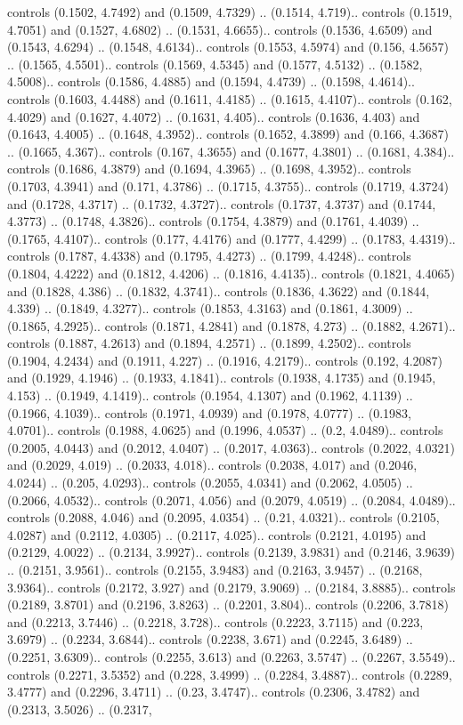 controls (0.1502, 4.7492) and (0.1509, 4.7329) .. (0.1514, 4.719).. controls (0.1519, 4.7051) and (0.1527, 4.6802) .. (0.1531, 4.6655).. controls (0.1536, 4.6509) and (0.1543, 4.6294) .. (0.1548, 4.6134).. controls (0.1553, 4.5974) and (0.156, 4.5657) .. (0.1565, 4.5501).. controls (0.1569, 4.5345) and (0.1577, 4.5132) .. (0.1582, 4.5008).. controls (0.1586, 4.4885) and (0.1594, 4.4739) .. (0.1598, 4.4614).. controls (0.1603, 4.4488) and (0.1611, 4.4185) .. (0.1615, 4.4107).. controls (0.162, 4.4029) and (0.1627, 4.4072) .. (0.1631, 4.405).. controls (0.1636, 4.403) and (0.1643, 4.4005) .. (0.1648, 4.3952).. controls (0.1652, 4.3899) and (0.166, 4.3687) .. (0.1665, 4.367).. controls (0.167, 4.3655) and (0.1677, 4.3801) .. (0.1681, 4.384).. controls (0.1686, 4.3879) and (0.1694, 4.3965) .. (0.1698, 4.3952).. controls (0.1703, 4.3941) and (0.171, 4.3786) .. (0.1715, 4.3755).. controls (0.1719, 4.3724) and (0.1728, 4.3717) .. (0.1732, 4.3727).. controls (0.1737, 4.3737) and (0.1744, 4.3773) .. (0.1748, 4.3826).. controls (0.1754, 4.3879) and (0.1761, 4.4039) .. (0.1765, 4.4107).. controls (0.177, 4.4176) and (0.1777, 4.4299) .. (0.1783, 4.4319).. controls (0.1787, 4.4338) and (0.1795, 4.4273) .. (0.1799, 4.4248).. controls (0.1804, 4.4222) and (0.1812, 4.4206) .. (0.1816, 4.4135).. controls (0.1821, 4.4065) and (0.1828, 4.386) .. (0.1832, 4.3741).. controls (0.1836, 4.3622) and (0.1844, 4.339) .. (0.1849, 4.3277).. controls (0.1853, 4.3163) and (0.1861, 4.3009) .. (0.1865, 4.2925).. controls (0.1871, 4.2841) and (0.1878, 4.273) .. (0.1882, 4.2671).. controls (0.1887, 4.2613) and (0.1894, 4.2571) .. (0.1899, 4.2502).. controls (0.1904, 4.2434) and (0.1911, 4.227) .. (0.1916, 4.2179).. controls (0.192, 4.2087) and (0.1929, 4.1946) .. (0.1933, 4.1841).. controls (0.1938, 4.1735) and (0.1945, 4.153) .. (0.1949, 4.1419).. controls (0.1954, 4.1307) and (0.1962, 4.1139) .. (0.1966, 4.1039).. controls (0.1971, 4.0939) and (0.1978, 4.0777) .. (0.1983, 4.0701).. controls (0.1988, 4.0625) and (0.1996, 4.0537) .. (0.2, 4.0489).. controls (0.2005, 4.0443) and (0.2012, 4.0407) .. (0.2017, 4.0363).. controls (0.2022, 4.0321) and (0.2029, 4.019) .. (0.2033, 4.018).. controls (0.2038, 4.017) and (0.2046, 4.0244) .. (0.205, 4.0293).. controls (0.2055, 4.0341) and (0.2062, 4.0505) .. (0.2066, 4.0532).. controls (0.2071, 4.056) and (0.2079, 4.0519) .. (0.2084, 4.0489).. controls (0.2088, 4.046) and (0.2095, 4.0354) .. (0.21, 4.0321).. controls (0.2105, 4.0287) and (0.2112, 4.0305) .. (0.2117, 4.025).. controls (0.2121, 4.0195) and (0.2129, 4.0022) .. (0.2134, 3.9927).. controls (0.2139, 3.9831) and (0.2146, 3.9639) .. (0.2151, 3.9561).. controls (0.2155, 3.9483) and (0.2163, 3.9457) .. (0.2168, 3.9364).. controls (0.2172, 3.927) and (0.2179, 3.9069) .. (0.2184, 3.8885).. controls (0.2189, 3.8701) and (0.2196, 3.8263) .. (0.2201, 3.804).. controls (0.2206, 3.7818) and (0.2213, 3.7446) .. (0.2218, 3.728).. controls (0.2223, 3.7115) and (0.223, 3.6979) .. (0.2234, 3.6844).. controls (0.2238, 3.671) and (0.2245, 3.6489) .. (0.2251, 3.6309).. controls (0.2255, 3.613) and (0.2263, 3.5747) .. (0.2267, 3.5549).. controls (0.2271, 3.5352) and (0.228, 3.4999) .. (0.2284, 3.4887).. controls (0.2289, 3.4777) and (0.2296, 3.4711) .. (0.23, 3.4747).. controls (0.2306, 3.4782) and (0.2313, 3.5026) .. (0.2317, 